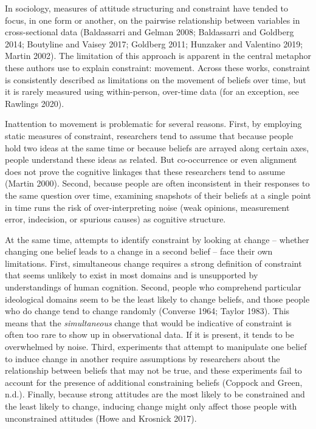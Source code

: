 \documentclass[12pt,]{article}
\begin{document}
In sociology, measures of attitude structuring and constraint have tended to focus, in one form or another, on the pairwise relationship between variables in cross-sectional data (Baldassarri and Gelman 2008; Baldassarri and Goldberg 2014; Boutyline and Vaisey 2017; Goldberg 2011; Hunzaker and Valentino 2019; Martin 2002). The limitation of this approach is apparent in the central metaphor these authors use to explain constraint: movement. Across these works, constraint is consistently described as limitations on the movement of beliefs over time, but it is rarely measured using within-person, over-time data (for an exception, see Rawlings 2020).

Inattention to movement is problematic for several reasons. First, by employing static measures of constraint, researchers tend to assume that because people hold two ideas at the same time or because beliefs are arrayed along certain axes, people understand these ideas as related. But co-occurrence or even alignment does not prove the cognitive linkages that these researchers tend to assume (Martin 2000). Second, because people are often inconsistent in their responses to the same question over time, examining snapshots of their beliefs at a single point in time runs the risk of over-interpreting noise (weak opinions, measurement error, indecision, or spurious causes) as cognitive structure.

At the same time, attempts to identify constraint by looking at change -- whether changing one belief leads to a change in a second belief -- face their own limitations. First, simultaneous change requires a strong definition of constraint that seems unlikely to exist in most domains and is unsupported by understandings of human cognition. Second, people who comprehend particular ideological domains seem to be the least likely to change beliefs, and those people who do change tend to change randomly (Converse 1964; Taylor 1983). This means that the \emph{simultaneous} change that would be indicative of constraint is often too rare to show up in observational data. If it is present, it tends to be overwhelmed by noise. Third, experiments that attempt to manipulate one belief to induce change in another require assumptions by researchers about the relationship between beliefs that may not be true, and these experiments fail to account for the presence of additional constraining beliefs (Coppock and Green, n.d.). Finally, because strong attitudes are the most likely to be constrained and the least likely to change, inducing change might only affect those people with unconstrained attitudes (Howe and Krosnick 2017).
\end{document}
